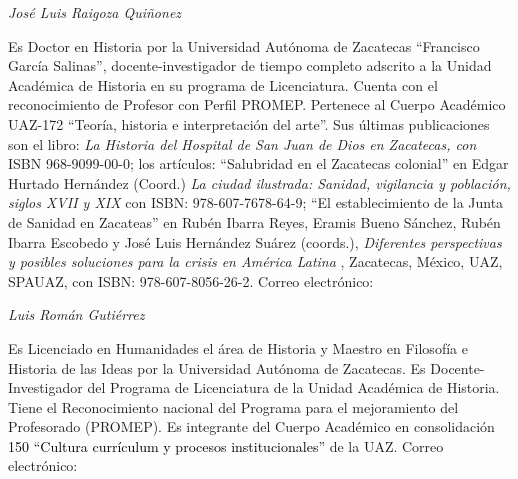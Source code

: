 \bigskip


\bigskip

{ 
\textit{ {José Luis Raigoza
Quiñonez}}}

{ 
 {Es Doctor en Historia por la
Universidad Autónoma de Zacatecas “Francisco García Salinas”,
docente-investigador de tiempo completo adscrito a la Unidad Académica de
Historia en su programa de Licenciatura. Cuenta con el reconocimiento de
Profesor con Perfil PROMEP. Pertenece al Cuerpo Académico UAZ-172 “Teoría,
historia e interpretación del arte”. Sus últimas publicaciones son el
libro: }\textit{ {La Historia del
Hospital de San Juan de Dios en Zacatecas, con
}} {ISBN 968-9099-00-0; los
artículos: “Salubridad en el Zacatecas colonial” en Edgar Hurtado Hernández
(Coord.) }\textit{ {La ciudad
ilustrada: Sanidad, vigilancia y población, siglos XVII y
XIX}} { con ISBN:
978-607-7678-64-9; “El establecimiento de la Junta de Sanidad en Zacateas”
en Rubén Ibarra Reyes, Eramis Bueno Sánchez, Rubén Ibarra Escobedo y José
Luis Hernández Suárez (coords.),
}\textit{ {Diferentes
perspectivas y posibles soluciones para la crisis en América
Latina}} {, Zacatecas, México,
UAZ, SPAUAZ, con ISBN: 978-607-8056-26-2.
} {Correo electrónico:
}\href{mailto:luisraigoza52@hotmail.com}{}}


\bigskip


\bigskip

{ 
\textit{ {Luis Román Gutiérrez}}}

{ 
Es Licenciado en Humanidades el área de Historia y Maestro en Filosofía e
Historia de las Ideas por la Universidad Autónoma de Zacatecas. Es
Docente-Investigador del Programa de Licenciatura de la Unidad Académica de
Historia. Tiene el Reconocimiento nacional del Programa para el
mejoramiento del Profesorado (PROMEP). Es integrante del Cuerpo Académico
en consolidación \textcolor{black}{150 “Cultura currículum y procesos
institucionales”} de la UAZ. Correo electrónico:
\href{mailto:luroma02@hotmail.com}{}}